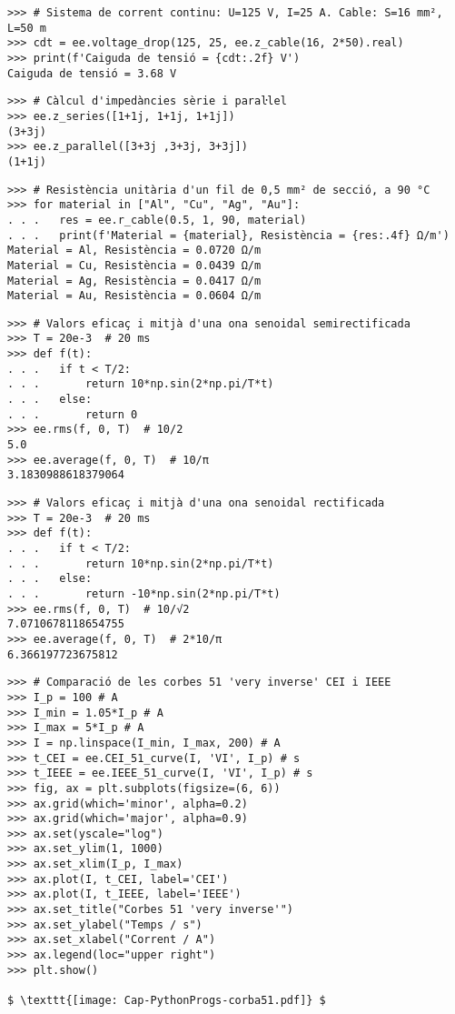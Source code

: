 \begin{lstlisting}
>>> # Sistema de corrent continu: U=125 V, I=25 A. Cable: S=16 mm², L=50 m
>>> cdt = ee.voltage_drop(125, 25, ee.z_cable(16, 2*50).real)
>>> print(f'Caiguda de tensió = {cdt:.2f} V')
Caiguda de tensió = 3.68 V
\end{lstlisting}

	
\begin{lstlisting}
>>> # Càlcul d'impedàncies sèrie i paraŀlel
>>> ee.z_series([1+1j, 1+1j, 1+1j])
(3+3j)
>>> ee.z_parallel([3+3j ,3+3j, 3+3j])
(1+1j)
\end{lstlisting}

\begin{lstlisting}
>>> # Resistència unitària d'un fil de 0,5 mm² de secció, a 90 °C 
>>> for material in ["Al", "Cu", "Ag", "Au"]:
. . .   res = ee.r_cable(0.5, 1, 90, material)
. . .   print(f'Material = {material}, Resistència = {res:.4f} Ω/m')
Material = Al, Resistència = 0.0720 Ω/m
Material = Cu, Resistència = 0.0439 Ω/m
Material = Ag, Resistència = 0.0417 Ω/m
Material = Au, Resistència = 0.0604 Ω/m        
\end{lstlisting}

\begin{lstlisting}
>>> # Valors eficaç i mitjà d'una ona senoidal semirectificada
>>> T = 20e-3  # 20 ms
>>> def f(t):
. . .   if t < T/2:
. . .       return 10*np.sin(2*np.pi/T*t)
. . .   else:
. . .       return 0
>>> ee.rms(f, 0, T)  # 10/2
5.0
>>> ee.average(f, 0, T)  # 10/π
3.1830988618379064
\end{lstlisting}

\begin{lstlisting}
>>> # Valors eficaç i mitjà d'una ona senoidal rectificada
>>> T = 20e-3  # 20 ms
>>> def f(t):
. . .   if t < T/2:
. . .       return 10*np.sin(2*np.pi/T*t)
. . .   else:
. . .       return -10*np.sin(2*np.pi/T*t)
>>> ee.rms(f, 0, T)  # 10/√2
7.0710678118654755
>>> ee.average(f, 0, T)  # 2*10/π
6.366197723675812
\end{lstlisting}

\begin{lstlisting}[mathescape=true]
>>> # Comparació de les corbes 51 'very inverse' CEI i IEEE
>>> I_p = 100 # A
>>> I_min = 1.05*I_p # A
>>> I_max = 5*I_p # A
>>> I = np.linspace(I_min, I_max, 200) # A
>>> t_CEI = ee.CEI_51_curve(I, 'VI', I_p) # s   
>>> t_IEEE = ee.IEEE_51_curve(I, 'VI', I_p) # s      
>>> fig, ax = plt.subplots(figsize=(6, 6))
>>> ax.grid(which='minor', alpha=0.2)
>>> ax.grid(which='major', alpha=0.9)
>>> ax.set(yscale="log")
>>> ax.set_ylim(1, 1000)
>>> ax.set_xlim(I_p, I_max)
>>> ax.plot(I, t_CEI, label='CEI')
>>> ax.plot(I, t_IEEE, label='IEEE')
>>> ax.set_title("Corbes 51 'very inverse'")
>>> ax.set_ylabel("Temps / s")
>>> ax.set_xlabel("Corrent / A")
>>> ax.legend(loc="upper right")
>>> plt.show()

$ \texttt{[image: Cap-PythonProgs-corba51.pdf]} $
\end{lstlisting}





